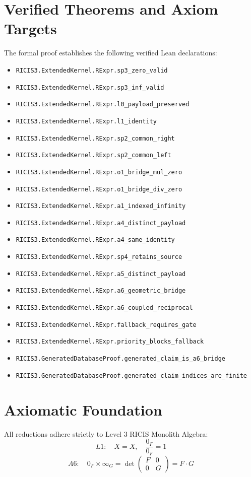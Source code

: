 \documentclass[11pt,a4paper]{article}
\begin{document}
\section{Verified Theorems and Axiom Targets}
The formal proof establishes the following verified Lean declarations:
\begin{itemize}
  \item \texttt{RICIS3.ExtendedKernel.RExpr.sp3_zero_valid}
  \item \texttt{RICIS3.ExtendedKernel.RExpr.sp3_inf_valid}
  \item \texttt{RICIS3.ExtendedKernel.RExpr.l0_payload_preserved}
  \item \texttt{RICIS3.ExtendedKernel.RExpr.l1_identity}
  \item \texttt{RICIS3.ExtendedKernel.RExpr.sp2_common_right}
  \item \texttt{RICIS3.ExtendedKernel.RExpr.sp2_common_left}
  \item \texttt{RICIS3.ExtendedKernel.RExpr.o1_bridge_mul_zero}
  \item \texttt{RICIS3.ExtendedKernel.RExpr.o1_bridge_div_zero}
  \item \texttt{RICIS3.ExtendedKernel.RExpr.a1_indexed_infinity}
  \item \texttt{RICIS3.ExtendedKernel.RExpr.a4_distinct_payload}
  \item \texttt{RICIS3.ExtendedKernel.RExpr.a4_same_identity}
  \item \texttt{RICIS3.ExtendedKernel.RExpr.sp4_retains_source}
  \item \texttt{RICIS3.ExtendedKernel.RExpr.a5_distinct_payload}
  \item \texttt{RICIS3.ExtendedKernel.RExpr.a6_geometric_bridge}
  \item \texttt{RICIS3.ExtendedKernel.RExpr.a6_coupled_reciprocal}
  \item \texttt{RICIS3.ExtendedKernel.RExpr.fallback_requires_gate}
  \item \texttt{RICIS3.ExtendedKernel.RExpr.priority_blocks_fallback}
  \item \texttt{RICIS3.GeneratedDatabaseProof.generated_claim_is_a6_bridge}
  \item \texttt{RICIS3.GeneratedDatabaseProof.generated_claim_indices_are_finite}
\end{itemize}

\section{Axiomatic Foundation}
All reductions adhere strictly to Level 3 RICIS Monolith Algebra:
\begin{equation}
L1: \quad X = X, \quad \frac{0_F}{0_F} = 1
\end{equation}
\begin{equation}
A6: \quad 0_F \times \infty_G = \det\begin{pmatrix} F & 0 \\ 0 & G \end{pmatrix} = F \cdot G
\end{equation}
\end{document}
